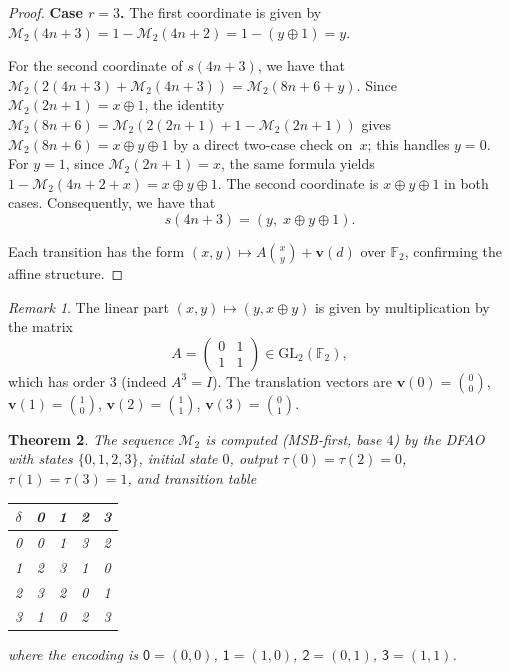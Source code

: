 \documentclass[12pt,reqno]{article}
\theoremstyle{plain}
\newtheorem{theorem}{Theorem}
\theoremstyle{definition}
\theoremstyle{remark}
\newtheorem{remark}[theorem]{Remark}
\begin{document}
\begin{proof}
\textbf{Case $r = 3$.}
 The first coordinate is given by $\mathcal{M}_{2}(4n+3) = 1 - \mathcal{M}_{2}(4n+2) = 1 - (y\oplus 1) = y$.

 For the second coordinate of $s(4n+3)$, we have that $\mathcal{M}_{2}(2(4n+3)+\mathcal{M}_{2}(4n+3)) = \mathcal{M}_{2}(8 n + 6 + 
 y)$. Since $\mathcal{M}_{2}(2n+1) = x \oplus 1$, the identity $\mathcal{M}_{2}(8n+6) = \mathcal{M}_{2}(2(2n+1) + 1 - 
 \mathcal{M}_{2}(2n+1))$ gives $\mathcal{M}_{2}(8n+6) = x \oplus y \oplus 1$ by a direct two-case check on~$x$; this handles $y = 
 0$. For $y=1$, since $\mathcal{M}_{2}(2n+1)=x$, the same formula yields $1-\mathcal{M}_{2}(4n+2+x) = x\oplus y\oplus 1$. The
 second coordinate is $x \oplus y \oplus 1$ in both cases. Consequently, we have that 
$$ s(4n+3) = (y,\; x \oplus y \oplus 1).
$$

Each transition has the form $(x,y) \mapsto A\binom{x}{y} + \mathbf{v}(d)$ over $\mathbb{F}_2$, confirming the affine structure.
\end{proof}

\begin{remark}
 The linear part $(x,y)\mapsto (y,x\oplus y)$ is given by multiplication by the matrix
\[A=\begin{pmatrix}0&1\\1&1\end{pmatrix}\in\mathrm{GL}_2(\mathbb{F}_2),\]
which has order $3$ (indeed $A^3=I$). The translation vectors are
$\mathbf{v}(0) = \binom{0}{0}$,
$\mathbf{v}(1) = \binom{1}{0}$,
$\mathbf{v}(2) = \binom{1}{1}$,
$\mathbf{v}(3) = \binom{0}{1}$.
\end{remark}

\begin{theorem}\label{thm:M2-dfao} 
 The sequence $\mathcal{M}_{2}$ is computed (MSB-first, base $4$) by the DFAO with states $\{0, 1, 2, 3\}$, initial state $0$, output 
 $\tau(0) = \tau(2) = 0$, $\tau(1) = \tau(3) = 1$, and transition table
\begin{center}
\normalfont
\begin{tabular}{c|cccc}
$\delta$ & 0 & 1 & 2 & 3 \\ \hline
0 & 0 & 1 & 3 & 2 \\
1 & 2 & 3 & 1 & 0 \\
2 & 3 & 2 & 0 & 1 \\
3 & 1 & 0 & 2 & 3 \\
\end{tabular}
\end{center}
 where the encoding is $\mathsf{0} = (0,0)$, $\mathsf{1} = (1,0)$, $\mathsf{2} = (0,1)$, $\mathsf{3} = (1,1)$.
\end{theorem}
\end{document}
